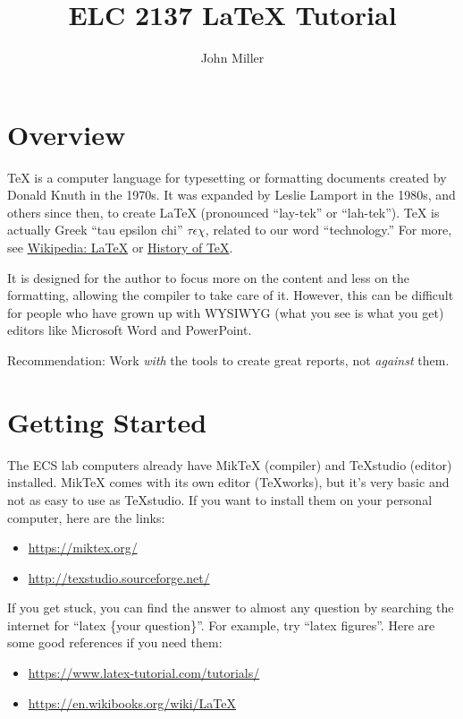 \documentclass[11pt]{article}
\begin{document}
\title{ELC 2137 LaTeX Tutorial}
\author{John Miller}
\maketitle


\section*{Overview}
TeX is a computer language for typesetting or formatting documents created by Donald Knuth in the 1970s.  It was expanded by Leslie Lamport in the 1980s, and others since then, to create LaTeX (pronounced ``lay-tek'' or ``lah-tek''). TeX is actually Greek ``tau epsilon chi'' $\tau \epsilon \chi$, related to our word ``technology.''  For more, see \href{https://en.wikipedia.org/wiki/LaTeX}{Wikipedia: LaTeX} or \href{http://tug.org/whatis.html}{History of TeX}.

It is designed for the author to focus more on the content and less on the formatting, allowing the compiler to take care of it.  However, this can be difficult for people who have grown up with WYSIWYG (what you see is what you get) editors like Microsoft Word and PowerPoint.  

Recommendation: Work \textit{with} the tools to create great reports, not \textit{against} them.


\section*{Getting Started}

The ECS lab computers already have MikTeX (compiler) and TeXstudio (editor) installed.  MikTeX comes with its own editor (TeXworks), but it's very basic and not as easy to use as TeXstudio.  If you want to install them on your personal computer, here are the links:

\begin{itemize}
	\item \url{https://miktex.org/}
	\item \url{http://texstudio.sourceforge.net/}
\end{itemize}

If you get stuck, you can find the answer to almost any question by searching the internet for ``latex \{your question\}''.  For example, try ``latex figures''.  Here are some good references if you need them:

\begin{itemize}
	\item \url{https://www.latex-tutorial.com/tutorials/}
	\item \url{https://en.wikibooks.org/wiki/LaTeX}
\end{itemize}
\end{document}

